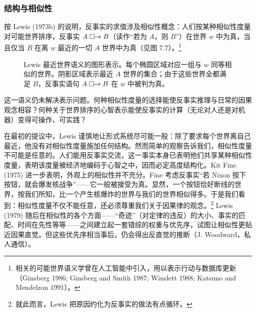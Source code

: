 \subsubsection*{结构与相似性}

按 Lewis (1973b) 的说明，反事实的求值涉及相似性概念：人们按某种相似性度量对可能世界排序，反事实 $A\mathrel{\square\!\!\rightarrow} B$（读作“若为 $A$，则 $B$”）在世界 $w$ 中为真，当且仅当 $B$ 在离 $w$ 最近的一切 $A$ 世界中为真（见图 7.7）。\footnote{相关的可能世界语义学曾在人工智能中引入，用以表示行动与数据库更新（Ginsberg 1986; Ginsberg and Smith 1987; Winslett 1988; Katsuno and Mendelzon 1991）。}

\begin{figure}[htbp]
\centering
{}
\renewcommand{\thefigure}{7.7}
\caption{Lewis 最近世界语义的图形表示。每个椭圆区域对应一组与 $w$ 同等相似的世界。阴影区域表示最近 $A$ 世界的集合；由于这些世界全都满足 $B$，反事实语句 $A\mathrel{\square\!\!\rightarrow} B$ 在 $w$ 中被判为真。}
\end{figure}

这一语义仍未解决表示问题。何种相似性度量的选择能使反事实推理与日常的因果观念相容？何种关于世界排序的心智表示能使反事实的计算（无论对人还是对机器）变得可操作、可实践？

在最初的提议中，Lewis 谨慎地让形式系统尽可能一般：除了要求每个世界离自己最近，他没有对相似性度量施加任何结构。然而简单的观察告诉我们，相似性度量不可能是任意的。人们能用反事实交流，这一事实本身已表明他们共享某种相似性度量，表明该度量被经济地编码于心智之中，因而必定高度结构化。Kit Fine (1975) 进一步表明，外观上的相似性并不充分。Fine 考虑反事实“若 Nixon 按下按钮，就会爆发核战争”——它一般被接受为真。显然，一个按钮恰好断线的世界，按我们所知，比一个产生核爆炸的世界与我们的世界相似得多。于是我们看到：相似性度量不仅不能任意，还必须尊重我们关于因果律的观念。\footnote{就此而言，Lewis 把原因约化为反事实的做法有点循环。} Lewis (1979) 随后在相似性的各个方面——“奇迹”（对定律的违反）的大小、事实的匹配、时间在先性等等——之间建立起一套错综的权重与优先序，试图让相似性更贴近因果直觉。但这些优先序相当事后，仍会得出反直觉的推断（J. Woodward，私人通信）。


